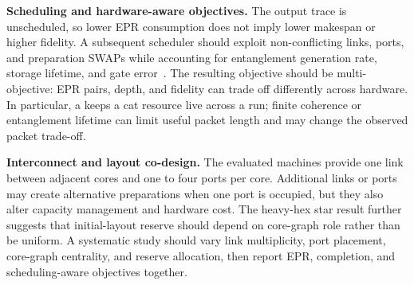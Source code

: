 \textbf{Scheduling and hardware-aware objectives.} The output trace is
unscheduled, so lower EPR consumption does not imply lower makespan or
higher fidelity. A subsequent scheduler should exploit non-conflicting links,
ports, and preparation SWAPs while accounting for entanglement generation
rate, storage lifetime, and gate error~\cite{baker2020time,ferrari2021compiler}.
The resulting objective should be multi-objective: EPR pairs, depth, and
fidelity can trade off differently across hardware. In particular, a
\TeleGatePacket{} keeps a cat resource live across a run; finite coherence
or entanglement lifetime can limit useful packet length and may change the
observed packet trade-off.

\textbf{Interconnect and layout co-design.} The evaluated machines provide
one link between adjacent cores and one to four ports per core. Additional
links or ports may create alternative preparations when one port is occupied,
but they also alter capacity management and hardware cost. The heavy-hex star
result further suggests that initial-layout reserve should depend on
core-graph role rather than be uniform. A systematic study should vary link
multiplicity, port placement, core-graph centrality, and reserve allocation,
then report EPR, completion, and scheduling-aware objectives together.
